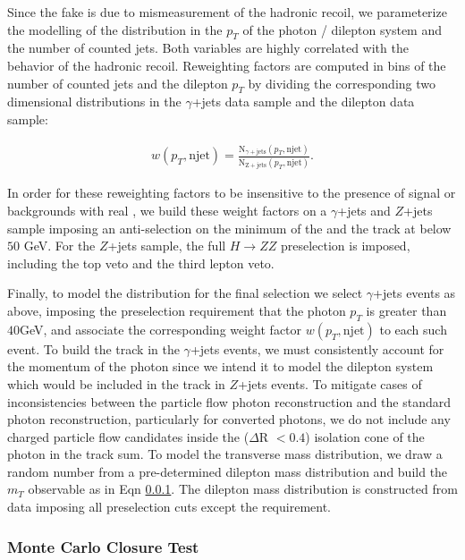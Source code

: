 Since the fake \met is due to mismeasurement of the hadronic recoil, we parameterize the 
modelling of the \met distribution in the $p_{T}$ of the photon / dilepton system and 
the number of counted jets. Both variables are highly correlated with the behavior 
of the hadronic recoil. Reweighting factors are computed in bins of the number of counted jets
and the dilepton $p_{T}$ by dividing the corresponding two dimensional distributions
in the $\gamma$+jets data sample and the dilepton data sample:

\begin{eqnarray}
  w(p_{T},\mathrm{njet}) = \frac{\mathrm{N}_{\gamma+\mathrm{jets}}(p_{T},\mathrm{njet})}{\mathrm{N}_{\mathrm{Z+jets}}(p_{T},\mathrm{njet})}.
\end{eqnarray}

In order for these reweighting factors to be insensitive to the presence of signal or backgrounds with 
real \met, we build these weight factors on a $\gamma$+jets and $Z$+jets sample imposing an anti-selection
on the minimum of the \met and the track \met at below $50$ GeV. For the $Z$+jets sample, 
the full $H \to ZZ$ preselection is imposed, 
including the top veto and the third lepton veto.

Finally, to model the \met distribution for the final selection we select $\gamma$+jets events
as above, imposing the preselection requirement that the photon $p_{T}$ is greater than $40$GeV,
and associate the corresponding weight factor $w(p_{T},\mathrm{njet})$ to each such event. To build
the track \met in the $\gamma$+jets events, we must consistently account for the momentum of
the photon since we intend it to model the dilepton system which would be included in the 
track \met in $Z$+jets events. To mitigate cases of inconsistencies between the particle flow 
photon reconstruction and the standard photon reconstruction, particularly for converted photons,
we do not include any charged particle flow candidates inside the ($\Delta$R $<0.4$) isolation cone 
of the photon in the track \met sum.
To model the transverse mass distribution, we draw a random number from a pre-determined dilepton
mass distribution and build the $m_{T}$ observable as in Eqn \ref{}. The dilepton mass distribution
is constructed from data imposing all preselection cuts except the \met requirement.

\subsubsection{Monte Carlo Closure Test}

